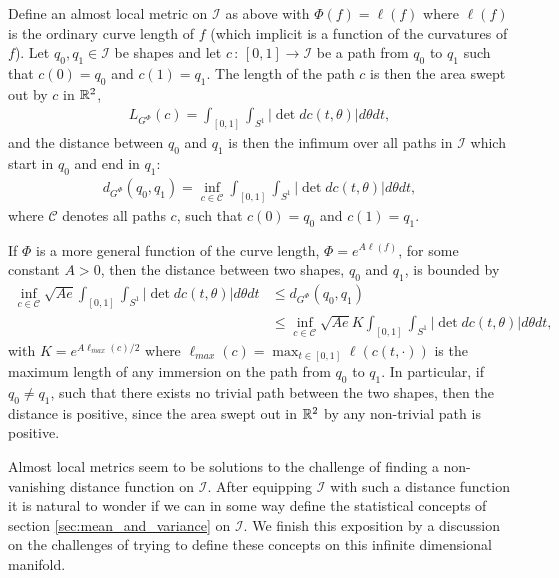 \begin{example}
Define an almost local metric on $\mathcal{I}$ as above with $\Phi(f) = \ell(f)$ where $\ell(f)$ is the ordinary curve length of $f$ (which implicit is a function of the curvatures of $f$). Let $q_0, q_1 \in \mathcal{I}$ be shapes and let $c \, : \, [0,1] \rightarrow \mathcal{I}$ be a path from $q_0$ to $q_1$ such that $c(0) = q_0$ and $c(1) = q_1$. The length of the path $c$ is then the area swept out by $c$ in $\mathbb{R}^2$,
\begin{align*}
L_{G^\Phi}(c) = \int_{[0,1]} \int_{S^1} \left| \det dc(t, \theta) \right| d\theta dt,
\end{align*}
and the distance between $q_0$ and $q_1$ is then the infimum over all paths in $\mathcal{I}$ which start in $q_0$ and end in $q_1$:
\begin{align*}
d_{G^\Phi}(q_0, q_1) = \inf_{c\in\mathcal{C}} \int_{[0,1]} \int_{S^1} \left| \det dc(t, \theta) \right| d\theta dt,
\end{align*}
where $\mathcal{C}$ denotes all paths $c$, such that $c(0) =q_0$ and $c(1) =q_1$. \\[0.2 cm]
\end{example}
\begin{example}
If $\Phi$ is a more general function of the curve length, $\Phi = e^{A \ell (f)}$, for some constant $A > 0$, then the distance between two shapes, $q_0$ and $q_1$, is bounded by
\begin{align*}
\inf_{c\in\mathcal{C}} \sqrt{A e} \int_{[0,1]} \int_{S^1} \left| \det dc(t, \theta) \right| d\theta dt & \leq d_{G^\Phi}(q_0, q_1) \\ 
& \leq \inf_{c\in\mathcal{C}} \sqrt{A e} K \int_{[0,1]} \int_{S^1} \left| \det dc(t, \theta) \right| d\theta dt,
\end{align*}
with $K = e^{A \ell_{max}(c) / 2}$ where $\ell_{max} (c) = \max_{t \in [0,1]} \ell (c(t, \cdot))$ is the maximum length of any immersion on the path from $q_0$ to $q_1$. In particular, if $q_0 \neq q_1$, such that there exists no trivial path between the two shapes, then the distance is positive, since the area swept out in $\mathbb{R}^2$ by any non-trivial path is positive. 
\end{example}
Almost local metrics seem to be solutions to the challenge of finding a non-vanishing distance function on $\mathcal{I}$. After equipping $\mathcal{I}$ with such a distance function it is natural to wonder if we can in some way define the statistical concepts of section \ref{sec:mean_and_variance} on $\mathcal{I}$. We finish this exposition by a discussion on the challenges of trying to define these concepts on this infinite dimensional manifold.




